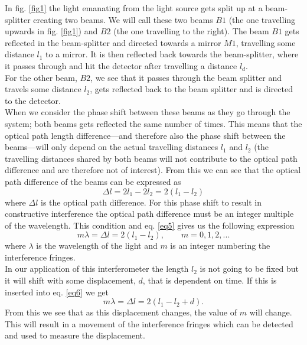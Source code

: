 In fig. \ref{fig1} the light emanating from the light source gets split up at a beam-splitter creating two beams. We will call these two beams $B1$ (the one travelling upwards in fig. \ref{fig1}) and $B2$ (the one travelling to the right).
The beam $B1$ gets reflected in the beam-splitter and directed towards a mirror $M1$, travelling some distance $l_1$ to a mirror. It is then reflected back towards the beam-splitter, where it passes through and hit the detector after travelling a distance $l_d$.\\

For the other beam, $B2$, we see that it passes through the beam splitter and travels some distance $l_2$, gets reflected back to the beam splitter and is directed to the detector.\\

When we consider the phase shift between these beams as they go through the system; both beams gets reflected the same number of times. This means that the optical path length difference---and therefore also the phase shift between the beams---will only depend on the actual travelling distances $l_1$ and $l_2$ (the travelling distances shared by both beams will not contribute to the optical path difference and are therefore not of interest).
From this we can see that the optical path difference of the beams can be expressed as
\begin{equation}
	\Delta l=2l_1-2l_2=2(l_1-l_2)
	\label{eq5}
\end{equation}
where $\Delta l$ is the optical path difference.
For this phase shift to result in constructive interference the optical path difference must be an integer multiple of the wavelength. This condition and eq. \ref{eq5} gives us the following expression
\begin{equation}
	m\lambda=\Delta l=2(l_1-l_2), \qquad m=0,1,2,...
	\label{eq6}
\end{equation}
where $\lambda$ is the wavelength of the light and $m$ is an integer numbering the interference fringes.\\

In our application of this interferometer the length $l_2$ is not going to be fixed but it will shift with some displacement, $d$, that is dependent on time. If this is inserted into eq. \ref{eq6} we get
\begin{equation}
	m\lambda=\Delta l=2(l_1-l_2+d).
	\label{eq7}
\end{equation}
From this we see that as this displacement changes, the value of $m$ will change. This will result in a movement of the interference fringes which can be detected and used to measure the displacement.